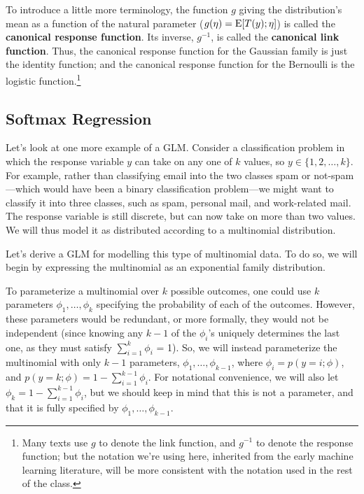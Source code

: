 \documentclass{article}
\begin{document}
To introduce a little more terminology, the function $g$ giving the distribution's mean as
a function of the natural parameter ($g(\eta) = {\rm E}[T(y);\eta]$) is called
the {\bf canonical response function}.  Its inverse, $g^{-1}$, is called
the {\bf canonical link function}.  Thus, the canonical response function
for the Gaussian family is just the identity function; and the canonical
response function for the Bernoulli is the logistic function.\footnote{Many
texts use $g$ to denote the link function, and $g^{-1}$ to denote the response
function; but the notation we're using here, inherited from the early machine
learning literature, will be more consistent with the notation used in the
rest of the class.}

\subsection{Softmax Regression}

Let's look at one more example of a GLM.  Consider a classification problem in which
the response variable $y$ can take on any one of $k$ values,
so $y \in \{1, 2, \ldots, k\}$.  For example, rather than classifying email into
the two classes spam or not-spam---which would have been a binary
classification problem---we might want to classify it into three classes,
such as spam, personal mail, and work-related mail.  The response variable is
still discrete, but can now take on more than two values.  We will
thus model it as distributed according to a multinomial distribution.

Let's derive a GLM for modelling this type of multinomial data.  To do so, we will
begin by expressing the multinomial as an exponential family distribution.

To parameterize a multinomial over $k$ possible outcomes, one could use $k$ parameters
$\phi_1, \ldots, \phi_k$ specifying the probability of each of the outcomes.  However,
these parameters would be redundant, or more formally, they would not be
independent (since knowing any $k-1$ of the $\phi_i$'s uniquely determines
the last one, as they must satisfy $\sum_{i=1}^k \phi_i$ = 1).  So, we will
instead parameterize the multinomial with only $k-1$ parameters,
$\phi_1, \ldots, \phi_{k-1}$, where $\phi_i = p(y=i;\phi)$, and
$p(y=k;\phi)=1-\sum_{i=1}^{k-1} \phi_i$.  For notational convenience, we
will also let $\phi_k = 1-\sum_{i=1}^{k-1} \phi_i$, but we should keep in mind that this
is not a parameter, and that it is fully specified by $\phi_1, \ldots, \phi_{k-1}$.
\end{document}
